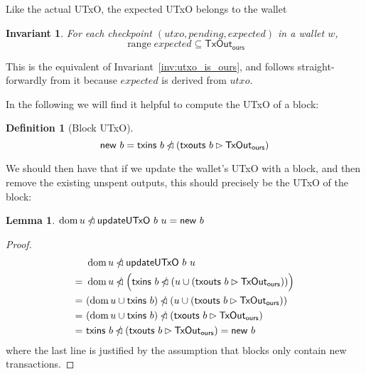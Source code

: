 \documentclass{article}
\DeclareMathOperator{\dom}{dom}
\DeclareMathOperator{\range}{range}
\newcommand{\restrictdom}{\lhd}
\newcommand{\subtractdom}{\mathbin{\slashed{\restrictdom}}}
\newcommand{\restrictrange}{\rhd}
\newtheorem{lemma}{Lemma}
\newtheorem{invariant}{Invariant}
\newtheorem{definition}{Definition}
\begin{document}
Like the actual UTxO, the expected UTxO belongs to the wallet

\begin{invariant}
For each checkpoint $(\mathit{utxo}, \mathit{pending}, \mathit{expected})$ in a wallet $w$,
\begin{equation*}
\range \mathit{expected} \subseteq \mathsf{TxOut}_\mathsf{ours}
\end{equation*}
\end{invariant}

This is the equivalent of Invariant~\ref{inv:utxo_is_ours}, and follows
straight-forwardly from it because $\mathit{expected}$ is derived from
$\mathit{utxo}$.

In the following we will find it helpful to compute the UTxO of a block:
%
\begin{definition}[Block UTxO]
\begin{equation*}
\mathsf{new} ~ b = \mathsf{txins} ~ b \subtractdom (\mathsf{txouts} ~ b \restrictrange \mathsf{TxOut_{ours}})
\end{equation*}
\end{definition}
%
We should then have that if we update the wallet's UTxO with a block, and then
remove the existing unspent outputs, this should precisely be the UTxO of
the block:
%
\begin{lemma} \label{lemma:update_remove_dom}
\begin{math}
\dom u \subtractdom \mathsf{updateUTxO} ~ b ~ u  = \mathsf{new} ~ b
\end{math}
\end{lemma}

\begin{proof}
\begin{align*}
  & ~ \dom u \subtractdom \mathsf{updateUTxO} ~ b ~ u \\
= & ~ \dom u \subtractdom \Bigl( \mathsf{txins} ~ b \subtractdom (u \cup (\mathsf{txouts} ~ b \restrictrange \mathsf{TxOut_{ours}})) \Bigr) \\
= & ~ (\dom u \cup \mathsf{txins} ~ b) \subtractdom (u \cup (\mathsf{txouts} ~ b \restrictrange \mathsf{TxOut_{ours}})) \\
= & ~ (\dom u \cup \mathsf{txins} ~ b) \subtractdom (\mathsf{txouts} ~ b \restrictrange \mathsf{TxOut_{ours}}) \\
= & ~ \mathsf{txins} ~ b \subtractdom (\mathsf{txouts} ~ b \restrictrange \mathsf{TxOut_{ours}}) = \mathsf{new} ~ b \\
\end{align*}
where the last line is justified by the assumption that blocks only contain
new transactions.
\end{proof}
\end{document}

